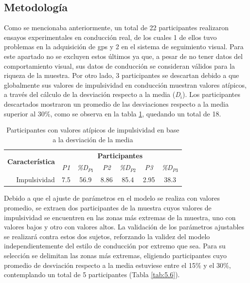 \subsection{Metodología}\label{541}
Como se mencionaba anteriormente, un total de 22 participantes realizaron ensayos experimentales en conducción real, de los cuales 1 de ellos tuvo problemas en la adquisición de \gls{gps} y 2 en el sistema de seguimiento visual. Para este apartado no se excluyen estos últimos ya que, a pesar de no tener datos del comportamiento visual, sus datos de conducción se consideran válidos para la riqueza de la muestra. Por otro lado, 3 participantes se descartan debido a que globalmente sus valores de impulsividad en conducción muestran valores atípicos, a través del cálculo de la desviación respecto a la media (\emph{D$_i$}). Los participantes descartados mostraron un promedio de las desviaciones respecto a la media superior al 30\%, como se observa en la tabla \ref{tab:5.5}, quedando un total de 18. 

\begin{table}[h]
\renewcommand{\arraystretch}{1.5} %
\centering
\begin{tabular}{rcccccc}
\multirow{2}{*}{\textbf{Característica}} & \multicolumn{6}{c}{\textbf{Participantes}}  \\ \cline{2-7} 
& \textit{P1}              &  \multicolumn{1}{c|}{\textit{\%D$_{P1}$}} & \textit{P2}              &  \multicolumn{1}{c|}{\textit{\%D$_{P2}$}} & \textit{P3}              &  \textit{\%D$_{P3}$}   \\ \hline
Impulsividad        & 7.5         & \multicolumn{1}{c|}{56.9}           & 8.86        & \multicolumn{1}{c|}{85.4}           & 2.95        & 38.3         \\ \hline
\end{tabular}
\caption{Participantes con valores atípicos de impulsividad en base a la desviación de la media}
\label{tab:5.5}
\end{table}

Debido a que el ajuste de parámetros en el modelo se realiza con valores promedio, se extraen dos participantes de la muestra cuyos valores de impulsividad se encuentren en las zonas más extremas de la muestra, uno con valores bajos y otro con valores altos. La validación de los parámetros ajustables se realizará contra estos dos sujetos, reforzando la validez del modelo independientemente del estilo de conducción por extremo que sea. Para su selección se delimitan las zonas más extremas, eligiendo participantes cuyo promedio de desviación respecto a la media estuviese entre el 15\% y el 30\%, contemplando un total de 5 participantes (Tabla \ref{tab:5.6}).

